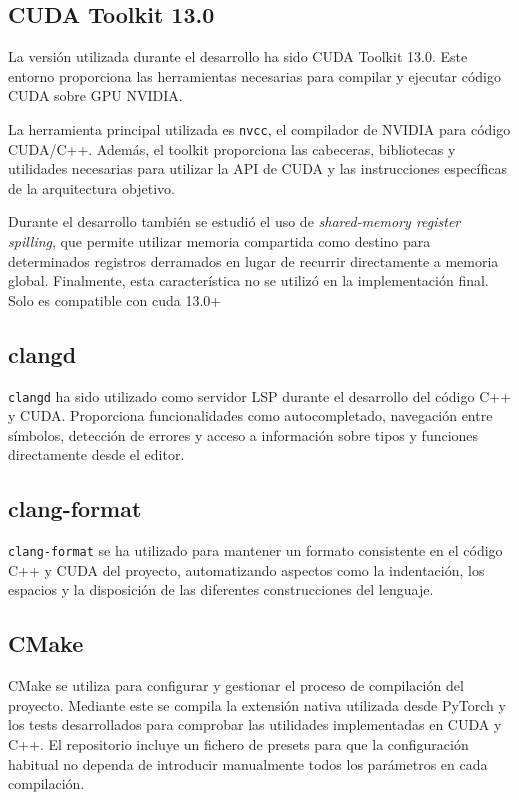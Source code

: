 \subsection{CUDA Toolkit 13.0}

La versión utilizada durante el desarrollo ha sido CUDA Toolkit 13.0. Este entorno proporciona las herramientas necesarias para compilar y ejecutar código CUDA sobre GPU NVIDIA.

La herramienta principal utilizada es \texttt{nvcc}, el compilador de NVIDIA para código CUDA/C++. Además, el toolkit proporciona las cabeceras, bibliotecas y utilidades necesarias para utilizar la API de CUDA y las instrucciones específicas de la arquitectura objetivo.

Durante el desarrollo también se estudió el uso de \textit{shared-memory register spilling}, que permite utilizar memoria compartida como destino para determinados registros derramados en lugar de recurrir directamente a memoria global. Finalmente, esta característica no se utilizó en la implementación final. Solo es compatible con cuda 13.0+

\subsection{clangd}

\texttt{clangd} ha sido utilizado como servidor LSP durante el desarrollo del código C++ y CUDA. Proporciona funcionalidades como autocompletado, navegación entre símbolos, detección de errores y acceso a información sobre tipos y funciones directamente desde el editor.

\subsection{clang-format}

\texttt{clang-format} se ha utilizado para mantener un formato consistente en el código C++ y CUDA del proyecto, automatizando aspectos como la indentación, los espacios y la disposición de las diferentes construcciones del lenguaje.

\subsection{CMake}

CMake se utiliza para configurar y gestionar el proceso de compilación del proyecto. Mediante este se compila la extensión nativa utilizada desde PyTorch y los tests desarrollados para comprobar las utilidades implementadas en CUDA y C++. El repositorio incluye un fichero de presets para que la configuración habitual no dependa de introducir manualmente todos los parámetros en cada compilación.

